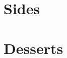 \documentclass{book}
\begin{document}
\tableofcontents
\chapter{Sides}

\chapter{Desserts}


\end{document}
